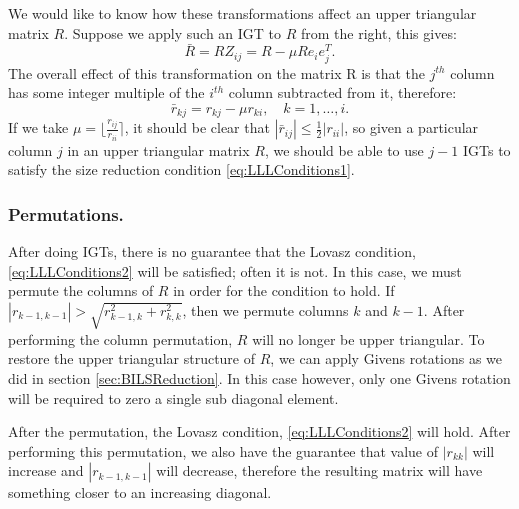 \documentclass[12pt,Bold,letterpaper]{mcgilletdclass}
\newcommand{\vsp}{\vspace{\baselineskip}}
\begin{document}
We would like to know how these transformations affect an upper triangular matrix $R$. Suppose we apply such an IGT to $R$ from the right, this gives:
\begin{equation}
\bar{R} = RZ_{ij} = R - \mu Re_ie_j^T.
\end{equation}
The overall effect of this transformation on the matrix R is that the $j^{th}$ column has some integer multiple of the $i^{th}$ column subtracted from it, therefore:
\begin{equation}
\bar{r}_{kj} = r_{kj} - \mu r_{ki}, \quad k=1 , \dots, i.
\end{equation}
If we take $\mu = \lfloor \frac{r_{ij}}{r_{ii}} \rceil$, it should be clear that
$|\bar{r}_{ij}| \le \frac{1}{2}|r_{ii}|$, so given a particular column $j$ in an
upper triangular matrix $R$, we should be able to use $j-1$ IGTs to satisfy the
size reduction condition \eqref{eq:LLLConditions1}.

\vsp \subsubsection{Permutations.} \label{subsec:Perm}
After doing IGTs, there is no guarantee that the Lovasz condition,
\eqref{eq:LLLConditions2} will be satisfied; often it is not. In this case, we
must permute the columns of $R$ in order for the condition to hold. If
$|r_{k-1,k-1}| > \sqrt{r^2_{k-1,k} + r^2_{k,k}}$, then we permute columns
$k$ and $k-1$. After performing the column permutation, $R$ will no longer be
upper triangular. To restore the upper triangular structure of $R$, we can apply
Givens rotations as we did in section \ref{sec:BILSReduction}. In this case
however, only one Givens rotation will be required to zero a single sub diagonal
element.

After the permutation, the Lovasz condition, \eqref{eq:LLLConditions2} will
hold. After performing this permutation, we also have the guarantee that value
of $|r_{kk}|$ will increase and $|r_{k-1,k-1}|$ will decrease, therefore the
resulting matrix will have something closer to an increasing diagonal.
\end{document}
